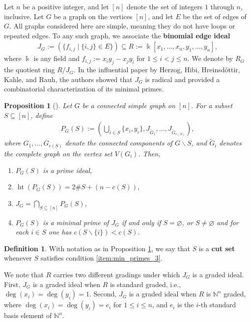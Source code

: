 \documentclass[12pt,a4paper]{amsart}
\theoremstyle{plain}
\newtheorem{prop}[thrm]{Proposition}
\def\bprop{\begin{prop}}
\def\eprop{\end{prop}}
\theoremstyle{definition}
\newtheorem{defn}[thrm]{Definition}
\def\bdefn{\begin{defn}}
\def\edefn{\end{defn}}
\theoremstyle{remark}
\let\setminus=\smallsetminus
\def\N{\mathbb{N}}
\def\k{\Bbbk}
\DeclareMathOperator{\hgt}{ht}
\renewcommand{\subset}{\subseteq}
\begin{document}
Let $n$ be a positive integer, and let $[n]$ denote the set of integers $1$ through $n$, inclusive. Let $G$ be a graph on the vertices $[n]$, and let $E$ be the set of edges of $G$. All graphs considered here are simple, meaning they do not have loops or repeated edges. To any such graph, we associate the \textbf{binomial edge ideal}
\begin{align*}
J_{G} := \left( \{ f_{i,j} \mid \{i,j\} \in E \} \right) \subset R := \k[x_{1},\ldots,x_{n},y_{1},\ldots,y_{n}],
\end{align*}
where $\k$ is any field and $f_{i,j} := x_{i}y_{j} - x_{j}y_{i}$ for $1 \leq i < j \leq n$. We denote by $R_{G}$ the quotient ring $R/J_{G}$. In the influential paper by Herzog, Hibi, Hreinsd\'{o}ttir, Kahle, and Rauh, the authors showed that $J_{G}$ is radical \cite[Corollary 2.2]{herzog2010binomial} and provided a combinatorial characterization of its minimal primes.
\bprop[{\cite[Lemma 3.1, Theorem 3.2, Corollary 3.9]{herzog2010binomial}}]
\label{prop:min_primes_binomial_edge_ideal}
Let $G$ be a connected simple graph on $[n]$. For a subset $S \subset [n]$, define 
\begin{align*}
    P_{G}(S) := (\bigcup_{i \in S} \{x_{i},y_{i}\},J_{\tilde{G}_{1}},\ldots,J_{\tilde{G}_{c(S)}}),
\end{align*}
where $G_{1},\ldots,G_{c(S)}$ denote the connected components of $G \setminus S$, and $\tilde{G}_{i}$ denotes the complete graph on the vertex set $V(G_{i})$. Then,
\begin{enumerate}
    \item $P_{G}(S)$ is a prime ideal,
    \item $\hgt (P_{G}(S)) = 2 \#S + (n - c(S))$,
    \item $J_{G} = \bigcap_{S \subset [n]} P_{G}(S)$,
    \item $P_{G}(S)$ is a minimal prime of $J_{G}$ if and only if $S = \varnothing$, or $S \neq \varnothing$ and for each $i \in S$ one has $c(S\setminus \{i\}) < c(S)$. \label{item:min_primes_3}
\end{enumerate}
\eprop

\bdefn
With notation as in Proposition \ref{prop:min_primes_binomial_edge_ideal}, we say that $S$ is a \textbf{cut set} whenever $S$ satisfies condition \eqref{item:min_primes_3}.
\edefn

We note that $R$ carries two different gradings under which $J_{G}$ is a graded ideal. First, $J_{G}$ is a graded ideal when $R$ is standard graded, i.e., $\deg(x_{i}) = \deg(y_{i}) = 1$. Second, $J_{G}$ is a graded ideal when $R$ is $\N^{n}$ graded, where $\deg(x_{i}) = \deg(y_{i}) = e_{i}$ for $1 \leq i \leq n$, and $e_{i}$ is the $i$-th standard basis element of $\N^{n}$. 
\end{document}
